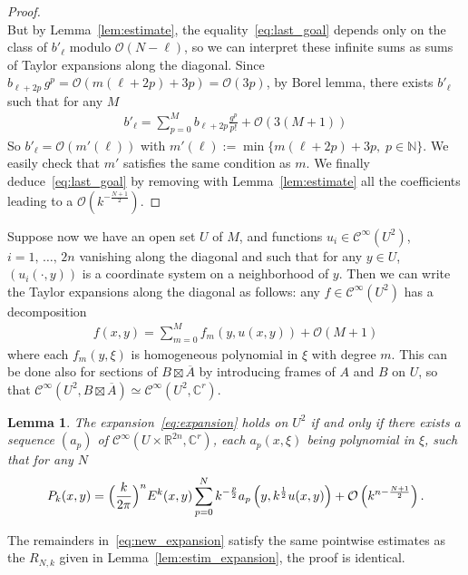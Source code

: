 \documentclass[10pt,a4paper]{article}
\newtheorem{lemm}[theo]{Lemma}
\theoremstyle{definition}
\numberwithin{equation}{section}
\newcommand{\R}{{\mathbb{R}}}
\newcommand{\N}{{\mathbb{N}}}
\newcommand{\C}{{\mathbb{C}}}
\newcommand{\con}{\overline}
\newcommand{\op}{\operatorname}
\newcommand{\Ci}{{\mathcal{C}}^{\infty}}
\newcommand{\bigo}{\mathcal{O}}
\newcommand{\kpi}{ \Bigl(\frac{k}{2 \pi} \Bigr)^n}
\begin{document}
\begin{proof}
\[\]
But by Lemma~\ref{lem:estimate}, the equality~\eqref{eq:last_goal} depends only on the class of $b'_{\ell}$ modulo $\bigo (N- \ell)$, so we can interpret these infinite sums as sums of Taylor expansions along the diagonal. Since $b_{\ell +2p} \, g^{p} = \bigo (m(\ell +2 p) + 3p) = \bigo (3p)$, by Borel lemma, there exists $b'_{\ell}$ such that for any $M$
\begin{gather}\label{eq:changement_E}
b'_{\ell} = \sum_{p=0}^M b_{\ell+ 2p } \frac{g^p}{p!} + \bigo (3(M+1))
\end{gather}
So $b'_{\ell} = \bigo (m '(\ell))$ with $ m' (\ell) := \op{min} \{ m(\ell + 2p) + 3p, \; p \in \N \}.$ We easily check that $m'$ satisfies the same condition as $m$. We finally deduce~\eqref{eq:last_goal} by removing with Lemma~\ref{lem:estimate} all the coefficients leading to a $\bigo (k^{-\frac{N+1}{2}})$.
\end{proof}

Suppose now we have an open set $U$ of $M$, and functions $u_i \in \Ci (U^2)$, $i =1, \,\ldots,\, 2n$ vanishing along the diagonal and such that for any $y \in U$, $(u_i(
\cdot, y))$ is a coordinate system on a neighborhood of $y$. Then we can write the Taylor expansions along the diagonal as follows: any $ f \in \Ci (U^2)$ has a decomposition
\begin{gather}\label{eq:taylor_expansion}
f(x,y) = \sum_{m=0}^M f_m (y, u(x,y)) + \bigo (M+1)
\end{gather}
where each $f_m (y,\xi)$ is homogeneous polynomial in $\xi$ with degree $m$. This can be done also for sections of $B \boxtimes \con{A}$ by introducing frames of $A$ and $B$ on $U$, so that $\Ci (U^2, B \boxtimes \con{A}) \simeq \Ci (U^2, \C^r)$.

\begin{lemm}\label{lem:new_expansion}
The expansion~\eqref{eq:expansion} holds on $U^2$ if and only if there exists a sequence $(a_p)$ of $\Ci (U \times \R^{2n}, \C^r)$, each $a_p (x,\xi)$ being polynomial in $\xi$, such that for any $N$
\begin{equation}\label{eq:new_expansion}
P_k (x,y) = \kpi E^k (x,y) \sum_{p=0}^{N} k^{-\frac{p}{2}} a_p \left(y, k^{\frac{1}{2}} u (x,y)\right) + \bigo \left(k^{n- \frac{N+1}{2}}\right).
\end{equation}
\end{lemm}

The remainders in~\eqref{eq:new_expansion} satisfy the same pointwise estimates as the $R_{N,k}$ given in Lemma~\ref{lem:estim_expansion}, the proof is identical.
\end{document}
